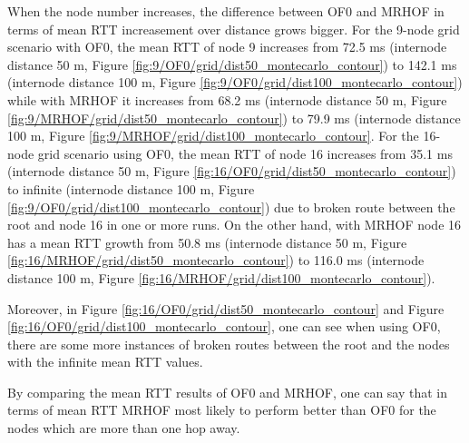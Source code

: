 When the node number increases, the difference between OF0 and MRHOF in terms of mean RTT increasement over distance grows bigger. For the 9-node grid scenario with OF0, the mean RTT of node 9 increases from 72.5 ms (internode distance 50 m, Figure \ref{fig:9/OF0/grid/dist50_montecarlo_contour}) to 142.1 ms (internode distance 100 m, Figure \ref{fig:9/OF0/grid/dist100_montecarlo_contour}) while with MRHOF it increases from 68.2 ms (internode distance 50 m, Figure \ref{fig:9/MRHOF/grid/dist50_montecarlo_contour}) to 79.9 ms (internode distance 100 m, Figure \ref{fig:9/MRHOF/grid/dist100_montecarlo_contour}. For the 16-node grid scenario using OF0, the mean RTT of node 16 increases from 35.1 ms (internode distance 50 m, Figure \ref{fig:16/OF0/grid/dist50_montecarlo_contour}) to infinite (internode distance 100 m, Figure \ref{fig:9/OF0/grid/dist100_montecarlo_contour}) due to broken route between the root and node 16 in one or more runs. On the other hand, with MRHOF node 16 has a mean RTT growth from 50.8 ms (internode distance 50 m, Figure \ref{fig:16/MRHOF/grid/dist50_montecarlo_contour}) to 116.0 ms (internode distance 100 m, Figure \ref{fig:16/MRHOF/grid/dist100_montecarlo_contour}).
\newline

Moreover, in Figure \ref{fig:16/OF0/grid/dist50_montecarlo_contour} and Figure \ref{fig:16/OF0/grid/dist100_montecarlo_contour}, one can see when using OF0, there are some more instances of broken routes between the root and the nodes with the infinite mean RTT values. 
\newline

By comparing the mean RTT results of OF0 and MRHOF, one can say that in terms of mean RTT MRHOF most likely to perform better than OF0 for the nodes which are more than one hop away. 
\newline

